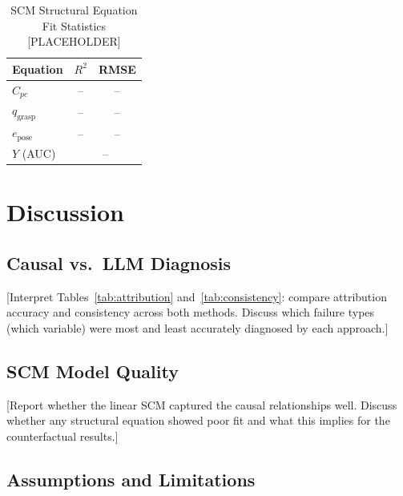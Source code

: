 \documentclass[journal]{IEEEtran}
\begin{document}
\begin{table}[t]
  \caption{SCM Structural Equation Fit Statistics [PLACEHOLDER]}
  \label{tab:scm_fit}
  \centering
  \begin{tabular}{lcc}
    \toprule
    \textbf{Equation} & $R^2$ & RMSE \\
    \midrule
    $C_{pc}$          & -- & -- \\
    $q_{\text{grasp}}$& -- & -- \\
    $e_{\text{pose}}$ & -- & -- \\
    $Y$ (AUC)         & \multicolumn{2}{c}{--} \\
    \bottomrule
  \end{tabular}
\end{table}

\section{Discussion}
\label{sec:discussion}

\subsection{Causal vs.\ LLM Diagnosis}

[Interpret Tables~\ref{tab:attribution} and~\ref{tab:consistency}:
compare attribution accuracy and consistency across both methods.
Discuss which failure types (which variable) were most and least
accurately diagnosed by each approach.]

\subsection{SCM Model Quality}

[Report whether the linear SCM captured the causal relationships
well.  Discuss whether any structural equation showed poor fit
and what this implies for the counterfactual results.]

\subsection{Assumptions and Limitations}
\label{sec:limitations}
\end{document}
